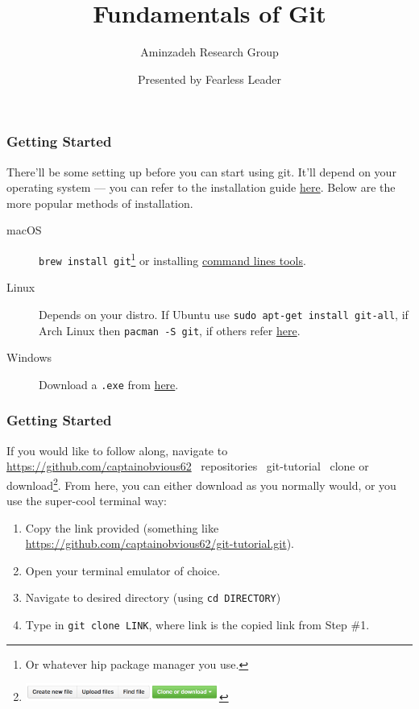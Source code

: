 \documentclass{beamer}
\title{Fundamentals of Git}
\subtitle{Aminzadeh Research Group}
\author{Presented by Fearless Leader}
\date{ }
\newcommand{\shellcmd}[1]{\texttt{\colorbox{gray!30}{#1}}}
\begin{document}
\begin{frame}
    \maketitle
\end{frame}

\begin{frame}
    \frametitle{Getting Started}

    There'll be some setting up before you can start using git. It'll depend on your operating system --- you can refer to the installation guide
    \href{https://git-scm.com/book/en/v2/Getting-Started-Installing-Git}{here}.
    Below are the more popular methods of installation.

    \begin{description}
        \item[macOS] \shellcmd{brew install git}\footnote{Or whatever hip package manager you use.} or installing \href{http://osxdaily.com/2014/02/12/install-command-line-tools-mac-os-x/}{command lines tools}.
        \item[Linux] Depends on your distro. If Ubuntu use \shellcmd{sudo apt-get install git-all}, if Arch Linux then \shellcmd{pacman -S git}, if others refer \href{https://git-scm.com/download/linux}{here}.
        \item[Windows] Download a \texttt{.exe} from \href{https://git-scm.com/download/win}{here}.
    \end{description}

\end{frame}

\begin{frame}
    \frametitle{Getting Started}
    If you would like to follow along, navigate to \url{https://github.com/captainobvious62} \textrightarrow \ repositories \textrightarrow \ git-tutorial \textrightarrow \ clone or download\footnote{\includegraphics[width=0.5\textwidth]{github-clone}}. From here, you can either download as you normally would, or you use the super-cool terminal way:

    \begin{enumerate}
        \item Copy the link provided (something like \url{https://github.com/captainobvious62/git-tutorial.git}).
        \item Open your terminal emulator of choice.
        \item Navigate to desired directory (using \shellcmd{cd DIRECTORY})
        \item Type in \shellcmd{git clone LINK}, where link is the copied link from Step \#1.
    \end{enumerate}


\end{frame}
\end{document}
